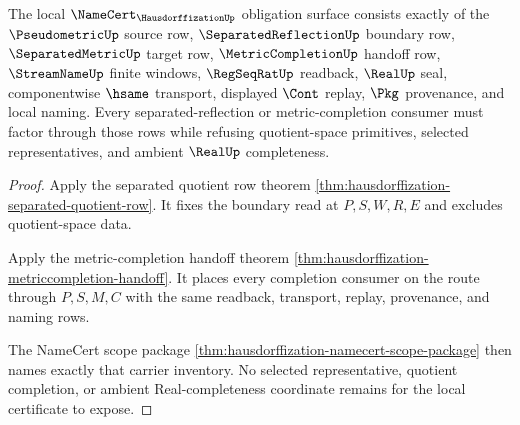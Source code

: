 \begin{theorem}
\label{thm:hausdorffization-namecert-obligation-surface}
The local $\NameCert_{\HausdorffizationUp}$ obligation surface consists exactly of the $\PseudometricUp$ source row, $\SeparatedReflectionUp$ boundary row, $\SeparatedMetricUp$ target row, $\MetricCompletionUp$ handoff row, $\StreamNameUp$ finite windows, $\RegSeqRatUp$ readback, $\RealUp$ seal, componentwise $\hsame$ transport, displayed $\Cont$ replay, $\Pkg$ provenance, and local naming. Every separated-reflection or metric-completion consumer must factor through those rows while refusing quotient-space primitives, selected representatives, and ambient $\RealUp$ completeness.
\end{theorem}
\begin{proof}
Apply the separated quotient row theorem \autoref{thm:hausdorffization-separated-quotient-row}. It fixes the boundary read at $P,S,W,R,E$ and excludes quotient-space data.

Apply the metric-completion handoff theorem \autoref{thm:hausdorffization-metriccompletion-handoff}. It places every completion consumer on the route through $P,S,M,C$ with the same readback, transport, replay, provenance, and naming rows.

The NameCert scope package \autoref{thm:hausdorffization-namecert-scope-package} then names exactly that carrier inventory. No selected representative, quotient completion, or ambient Real-completeness coordinate remains for the local certificate to expose.
\end{proof}


